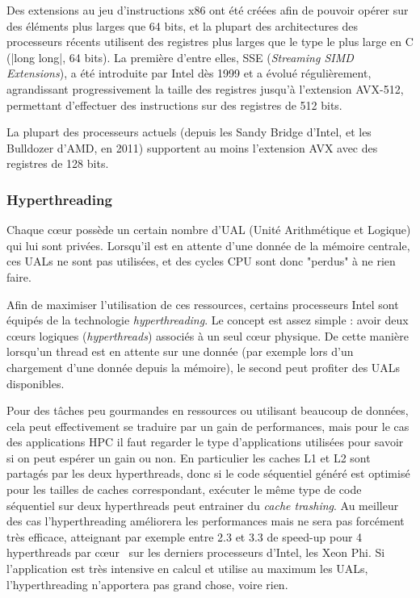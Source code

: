 Des extensions au jeu d'instructions x86 ont été créées afin de pouvoir opérer sur des éléments plus larges que 64 bits, et la plupart des architectures des processeurs récents utilisent des registres plus larges que le type le plus large en C (|long long|, 64 bits).
La première d'entre elles, SSE (\emph{Streaming SIMD Extensions}), a été introduite par Intel dès 1999 et a évolué régulièrement, agrandissant progressivement la taille des registres jusqu'à l'extension AVX-512, permettant d'effectuer des instructions sur des registres de 512 bits.

La plupart des processeurs actuels (depuis les Sandy Bridge d'Intel, et les Bulldozer d'AMD, en 2011) supportent au moins l'extension AVX avec des registres de 128 bits.

\subsubsection{Hyperthreading}

Chaque cœur possède un certain nombre d'UAL (Unité Arithmétique et Logique) qui lui sont privées. Lorsqu'il est en attente d'une donnée de la mémoire centrale, ces UALs ne sont pas utilisées, et des cycles CPU sont donc "perdus" à ne rien faire.

Afin de maximiser l'utilisation de ces ressources, certains processeurs Intel sont équipés de la technologie \emph{hyperthreading}.
Le concept est assez simple : avoir deux cœurs logiques (\emph{hyperthreads}) associés à un seul cœur physique.
De cette manière lorsqu'un thread est en attente sur une donnée (par exemple lors d'un chargement d'une donnée depuis la mémoire), le second peut profiter des UALs disponibles.

Pour des tâches peu gourmandes en ressources ou utilisant beaucoup de données, cela peut effectivement se traduire par un gain de performances, mais pour le cas des applications HPC il faut regarder le type d'applications utilisées pour savoir si on peut espérer un gain ou non.
En particulier les caches L1 et L2 sont partagés par les deux hyperthreads, donc si le code séquentiel généré est optimisé pour les tailles de caches correspondant, exécuter le même type de code séquentiel sur deux hyperthreads peut entrainer du \emph{cache trashing}.
Au meilleur des cas l'hyperthreading améliorera les performances mais ne sera pas forcément très efficace, atteignant par exemple entre 2.3 et 3.3 de speed-up pour 4 hyperthreads par cœur~\cite{Jeffers2016} sur les derniers processeurs d'Intel, les Xeon Phi.
Si l'application est très intensive en calcul et utilise au maximum les UALs, l'hyperthreading n'apportera pas grand chose, voire rien.

